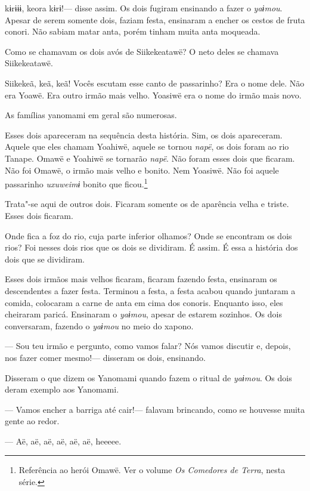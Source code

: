  

 kɨrɨɨɨ, keora kɨrɨ!--- disse assim. 
Os dois fugiram ensinando a fazer o \emph{yaɨmou}. Apesar de serem
somente dois, faziam festa, ensinaram a encher os cestos de fruta
conori. Não sabiam matar anta, porém tinham muita anta moqueada. 

Como se chamavam os dois avós de Siikekeatawë? O neto deles se chamava
Siikekeatawë. 

Siikekeã, keã, keã! Vocês escutam esse canto de passarinho? Era o
nome dele. Não era Yoawë. Era outro irmão mais velho. Yoasiwë era o nome
do irmão mais novo. 

As famílias yanomami em geral são numerosas. 

Esses dois apareceram na sequência desta história. Sim, os dois
apareceram. Aquele que eles chamam Yoahiwë, aquele se
tornou \emph{napë}, os dois foram ao rio Tanape. Omawë e Yoahiwë se
tornarão \emph{napë}. Não foram esses dois que ficaram. Não foi Omawë, o
irmão mais velho e bonito. Nem Yoasiwë. Não foi aquele
passarinho \emph{uxuweimɨ} bonito que ficou.\footnote{  Referência ao herói Omawë. Ver o volume \emph{Os Comedores de Terra}, nesta série.} 

Trata"-se aqui de outros dois. Ficaram somente os de aparência velha e triste. Esses dois ficaram.

Onde fica a foz do rio, cuja parte inferior olhamos? Onde se encontram
os dois rios? Foi nesses dois rios que os dois se dividiram. É assim. É essa a história dos dois que se dividiram. 

Esses dois irmãos mais velhos ficaram, ficaram fazendo festa, ensinaram
os descendentes a fazer festa. Terminou a festa, a festa acabou quando
juntaram a comida, colocaram a carne de anta em cima dos conoris.
Enquanto isso, eles cheiraram paricá. Ensinaram o \emph{yaɨmou}, apesar de estarem sozinhos. Os dois conversaram,
fazendo o \emph{yaɨmou} no meio do xapono. 

--- Sou teu irmão e pergunto, como vamos falar? Nós vamos discutir e,
depois, nos fazer comer mesmo!--- disseram os dois, ensinando. 

Disseram o que dizem os Yanomami quando fazem o ritual de \emph{yaɨmou}.
Os dois deram exemplo aos Yanomami. 

--- Vamos encher a barriga até cair!--- falavam brincando, como se
houvesse muita gente ao redor. 

--- Aë, aë, aë, aë, aë, aë, heeeee. 

